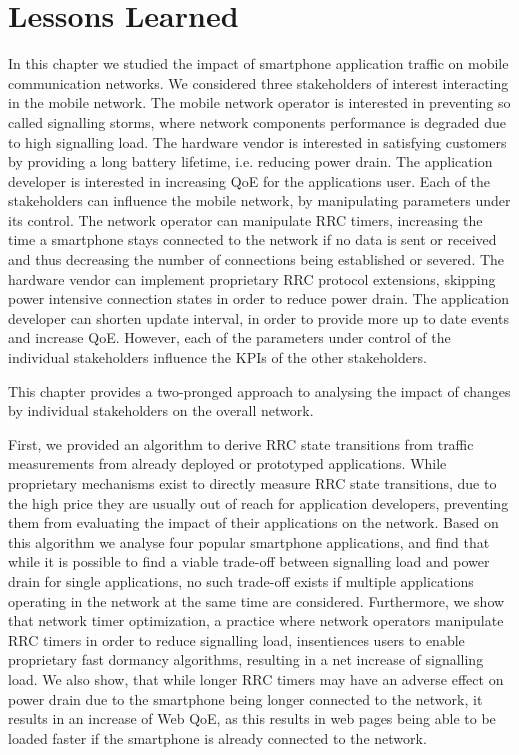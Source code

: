 \section{Lessons Learned}\label{sec:network:lessons_learned}
In this chapter we studied the impact of smartphone application traffic on mobile communication networks.
We considered three stakeholders of interest interacting in the mobile network.
The mobile network operator is interested in preventing so called signalling storms, where network components performance is degraded due to high signalling load.
The hardware vendor is interested in satisfying customers by providing a long battery lifetime, i.e. reducing power drain.
The application developer is interested in increasing \gls{QoE} for the applications user.
Each of the stakeholders can influence the mobile network, by manipulating parameters under its control.
The network operator can manipulate \gls{RRC} timers, increasing the time a smartphone stays connected to the network if no data is sent or received and thus decreasing the number of connections being established or severed. 
The hardware vendor can implement proprietary \gls{RRC} protocol extensions, skipping power intensive connection states in order to reduce power drain.
The application developer can shorten update interval, in order to provide more up to date events and increase \gls{QoE}.
However, each of the parameters under control of the individual stakeholders influence the \glspl{KPI} of the other stakeholders.

This chapter provides a two-pronged approach to analysing the impact of changes by individual stakeholders on the overall network.

First, we provided an algorithm to derive \gls{RRC} state transitions from traffic measurements from already deployed or prototyped applications.
While proprietary mechanisms exist to directly measure \gls{RRC} state transitions, due to the high price they are usually out of reach for application developers, preventing them from evaluating the impact of their applications on the network.
Based on this algorithm we analyse four popular smartphone applications, and find that while it is possible to find a viable trade-off between signalling load and power drain for single applications, no such trade-off exists if multiple applications operating in the network at the same time are considered.
Furthermore, we show that network timer optimization, a practice where network operators manipulate \gls{RRC} timers in order to reduce signalling load, insentiences users to enable proprietary fast dormancy algorithms, resulting in a net increase of signalling load.
We also show, that while longer \gls{RRC} timers may have an adverse effect on power drain due to the smartphone being longer connected to the network, it results in an increase of Web \gls{QoE}, as this results in web pages being able to be loaded faster if the smartphone is already connected to the network.


